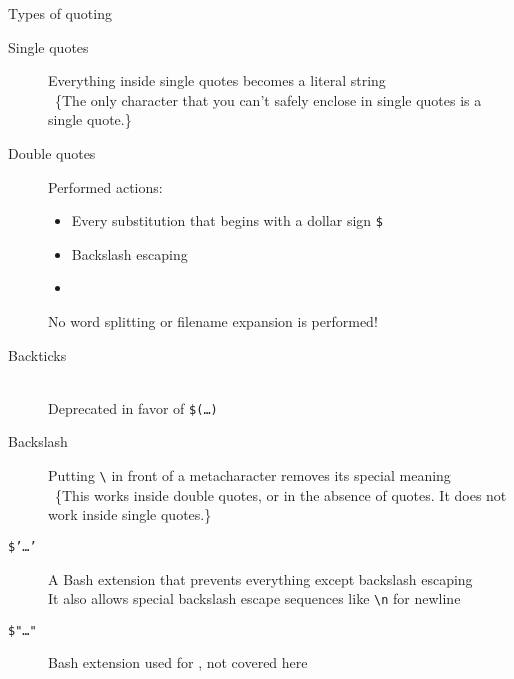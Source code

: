 
\begin{frame}[label={Quotes}]{Types of quoting}
    \vspace{-4mm}
    \begin{description}
        \item[Single quotes] Everything inside single quotes becomes a literal string\\[-0.3em]
                             {~\tiny\{The only character that you can't safely enclose in single quotes is a single quote.\}}
        \item[Double quotes] Performed actions:
                             \begin{itemize}
                                 \item Every substitution that begins with a dollar sign \texttt{\$}
                                 \item Backslash escaping
                                 \item {}
                             \end{itemize}
                             \alert{No word splitting or filename expansion is performed!}
        \item[Backticks] \\
                         \alert{Deprecated in favor of \texttt{\$(\ldots)}}
        \item[Backslash] Putting \texttt{\textbackslash} in front of a metacharacter removes its special meaning\\[-0.3em]
                         {~\tiny\{This works inside double quotes, or in the absence of quotes. It does not work inside single quotes.\}} 
        \item[\texttt{\$'\ldots'}] A Bash extension that prevents everything except backslash escaping\\
                                   It also allows special backslash escape sequences like \texttt{\textbackslash{}n} for newline%
        \item[\texttt{\$"\ldots"}] Bash extension used for , not covered here
    \end{description}
\end{frame}
